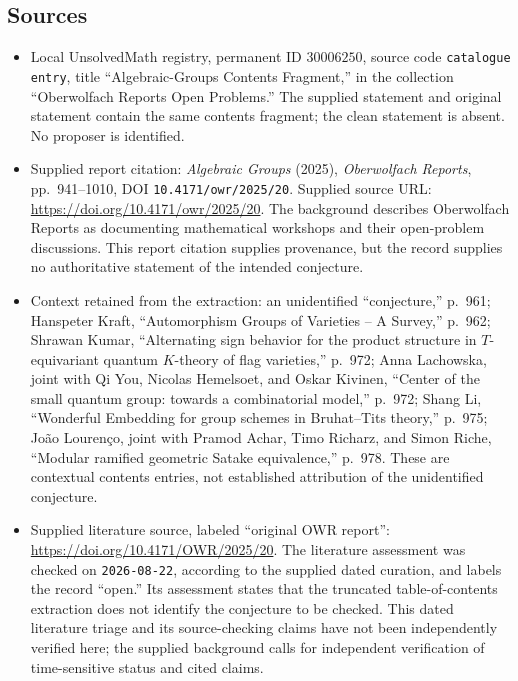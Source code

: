 \documentclass[11pt]{article}
\begin{document}
\subsection{Sources}
\begin{itemize}
\item Local UnsolvedMath registry, permanent ID \(30006250\), source code \texttt{catalogue entry}, title ``Algebraic-Groups Contents Fragment,'' in the collection ``Oberwolfach Reports Open Problems.'' The supplied statement and original statement contain the same contents fragment; the clean statement is absent. No proposer is identified.
\item Supplied report citation: \emph{Algebraic Groups} (2025), \emph{Oberwolfach Reports}, pp.\ 941--1010, DOI \texttt{10.4171/owr/2025/20}. Supplied source URL: \url{https://doi.org/10.4171/owr/2025/20}. The background describes Oberwolfach Reports as documenting mathematical workshops and their open-problem discussions. This report citation supplies provenance, but the record supplies no authoritative statement of the intended conjecture.
\item Context retained from the extraction: an unidentified ``conjecture,'' p.\ 961; Hanspeter Kraft, ``Automorphism Groups of Varieties -- A Survey,'' p.\ 962; Shrawan Kumar, ``Alternating sign behavior for the product structure in \(T\)-equivariant quantum \(K\)-theory of flag varieties,'' p.\ 972; Anna Lachowska, joint with Qi You, Nicolas Hemelsoet, and Oskar Kivinen, ``Center of the small quantum group: towards a combinatorial model,'' p.\ 972; Shang Li, ``Wonderful Embedding for group schemes in Bruhat--Tits theory,'' p.\ 975; João Lourenço, joint with Pramod Achar, Timo Richarz, and Simon Riche, ``Modular ramified geometric Satake equivalence,'' p.\ 978. These are contextual contents entries, not established attribution of the unidentified conjecture.
\item Supplied literature source, labeled ``original OWR report'': \url{https://doi.org/10.4171/OWR/2025/20}. The literature assessment was checked on \texttt{2026-08-22}, according to the supplied dated curation, and labels the record ``open.'' Its assessment states that the truncated table-of-contents extraction does not identify the conjecture to be checked. This dated literature triage and its source-checking claims have not been independently verified here; the supplied background calls for independent verification of time-sensitive status and cited claims.
\end{itemize}
\end{document}

